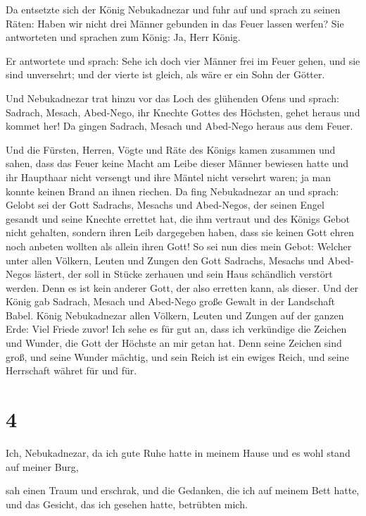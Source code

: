 Da entsetzte sich der König Nebukadnezar und fuhr auf
und sprach zu seinen Räten: Haben wir nicht drei Männer gebunden in das
Feuer lassen werfen? Sie antworteten und sprachen zum König: Ja, Herr
König.

 Er antwortete und sprach: Sehe ich doch vier Männer frei
im Feuer gehen, und sie sind unversehrt; und der vierte ist gleich, als
wäre er ein Sohn der Götter.

 Und Nebukadnezar trat hinzu vor das Loch des glühenden
Ofens und sprach: Sadrach, Mesach, Abed-Nego, ihr Knechte Gottes des
Höchsten, gehet heraus und kommet her! Da gingen Sadrach, Mesach und
Abed-Nego heraus aus dem Feuer.

 Und die Fürsten, Herren, Vögte und Räte des Königs kamen
zusammen und sahen, dass das Feuer keine Macht am Leibe dieser Männer
bewiesen hatte und ihr Haupthaar nicht versengt und ihre Mäntel nicht
versehrt waren; ja man konnte keinen Brand an ihnen riechen.
 Da fing Nebukadnezar an und sprach: Gelobt sei der Gott
Sadrachs, Mesachs und Abed-Negos, der seinen Engel gesandt und seine
Knechte errettet hat, die ihm vertraut und des Königs Gebot nicht
gehalten, sondern ihren Leib dargegeben haben, dass sie keinen Gott
ehren noch anbeten wollten als allein ihren Gott!  So sei
nun dies mein Gebot: Welcher unter allen Völkern, Leuten und Zungen den
Gott Sadrachs, Mesachs und Abed-Negos lästert, der soll in Stücke
zerhauen und sein Haus schändlich verstört werden. Denn es ist kein
anderer Gott, der also erretten kann, als dieser.  Und
der König gab Sadrach, Mesach und Abed-Nego große Gewalt in der
Landschaft Babel.  König Nebukadnezar allen Völkern,
Leuten und Zungen auf der ganzen Erde: Viel Friede zuvor!
 Ich sehe es für gut an, dass ich verkündige die Zeichen
und Wunder, die Gott der Höchste an mir getan hat.  Denn
seine Zeichen sind groß, und seine Wunder mächtig, und sein Reich ist
ein ewiges Reich, und seine Herrschaft währet für und für.

\hypertarget{section-3}{%
\section{4}\label{section-3}}

 Ich, Nebukadnezar, da ich gute Ruhe hatte in meinem Hause
und es wohl stand auf meiner Burg,

 sah einen Traum und erschrak, und die Gedanken, die ich
auf meinem Bett hatte, und das Gesicht, das ich gesehen hatte, betrübten
mich.

